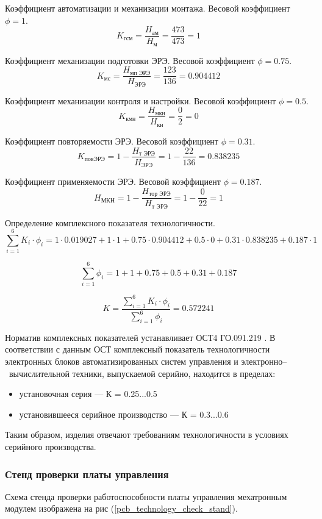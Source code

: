 Коэффициент автоматизации и механизации монтажа.
Весовой коэффициент $\phi = 1$.
$$
K_{\text{гсм}}
    = \frac{H_\text{ам}}
           {H_\text{м}}
    = \frac{473}{473}
    = 1
$$

Коэффициент механизации подготовки ЭРЭ.
Весовой коэффициент $\phi = 0.75$.
$$
K_{\text{мс}}
    = \frac{H_\text{мп ЭРЭ}}
           {H_\text{ЭРЭ}}
    = \frac{123}{136}
    = 0.904412
$$

Коэффициент механизации контроля и настройки.
Весовой коэффициент $\phi = 0.5$.
$$
K_\text{кмн}
    = \frac{H_\text{мкн}}
           {H_\text{кн}}
    = \frac{0}{2}
    = 0
$$

Коэффициент повторяемости ЭРЭ.
Весовой коэффициент $\phi = 0.31$.
$$
K_\text{повЭРЭ}
    = 1 - \frac{H_\text{т ЭРЭ}}
               {H_\text{ЭРЭ}}
    = 1 - \frac{22}{136}
    = 0.838235
$$

Коэффициент применяемости ЭРЭ.
Весовой коэффициент $\phi = 0.187$.
$$
H_{\text{МКН}}
    = 1 - \frac{H_\text{тор ЭРЭ}}
               {H_\text{т ЭРЭ}}
    = 1 - \frac{0}{22}
    = 1
$$

Определение комплексного показателя технологичности.
$$
\sum_{i=1}^6 K_i \cdot \phi_i =     1 \cdot 0.019027
                                +   1 \cdot 1
                                +   0.75 \cdot 0.904412
                                +   0.5 \cdot 0
                                +   0.31 \cdot 0.838235
                                +   0.187 \cdot 1
$$

$$
\sum_{i=1}^6 \phi_i = 1 + 1 + 0.75 + 0.5 + 0.31 + 0.187
$$

$$
K   = \frac{\sum_{i=1}^6 K_i \cdot \phi_i }
        {\sum_{i=1}^6 \phi_i }
    = 0.572241
$$

Норматив комплексных показателей устанавливает ОСТ4 ГО.091.219 \cite{OST4_GO_010_011}.
В соответствии с данным ОСТ комплексный показатель технологичности электронных
блоков автоматизированных систем управления и электронно--~вычислительной техники,
выпускаемой серийно, находится в пределах:

\begin{itemize}
    \item установочная серия --- К = 0.25...0.5
    \item установившееся серийное производство --- К = 0.3...0.6
\end{itemize}

Таким образом, изделия отвечают требованиям технологичности в условиях
серийного производства.

\subsubsection{Стенд проверки платы управления}
Схема стенда проверки работоспособности платы управления мехатронным модулем
изображена на рис (\ref{pcb_technology_check_stand}).

